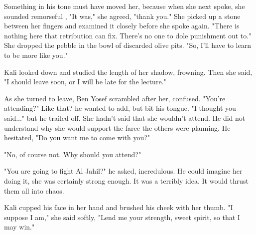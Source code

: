 \documentclass{amsart}
\begin{document}
Something in his tone must have moved her, because when she next spoke, she sounded remorseful , "It was," she agreed, "thank you." She picked up a stone between her fingers and examined it closely before she spoke again. "There is nothing here that retribution can fix. There's no one to dole punishment out to."  She dropped the pebble in the bowl of discarded olive pits. "So, I'll have to learn to be more like you." 

Kali looked down and studied the length of her shadow, frowning. Then she said, "I should leave soon, or I will be late for the lecture." 

As she turned to leave, Ben Yosef scrambled after her, confused. "You're attending?" Like that? he wanted to add, but bit his tongue. "I thought you said..." but he trailed off. She hadn't said that she wouldn't attend. He did not understand why she would support the farce the others were planning. He hesitated, "Do you want me to come with you?" 

"No, of course not. Why should you attend?"

"You are going to fight Al Jahil?" he asked, incredulous. He could imagine her doing it, she was certainly strong enough. It was a terribly idea. It would thrust them all into chaos.

Kali cupped his face in her hand and brushed his cheek with her thumb. "I suppose I am," she said softly, "Lend me your strength, sweet spirit, so that I may win." 
\end{document}
